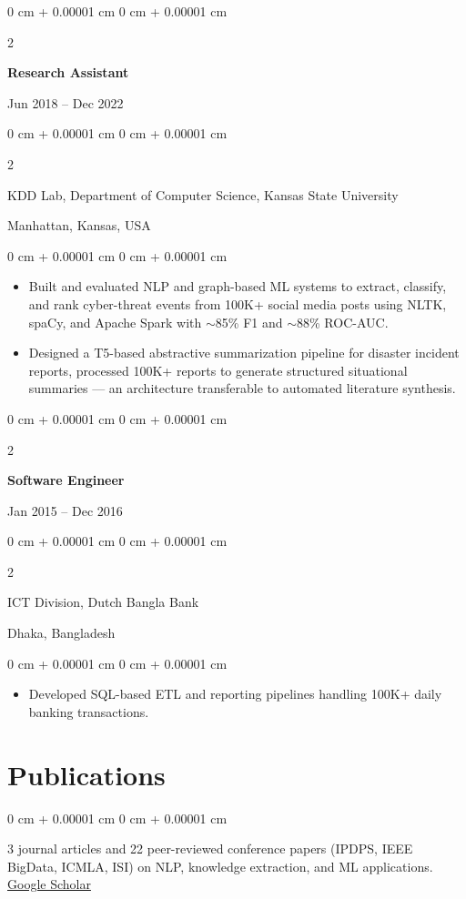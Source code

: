 \documentclass[10pt, letterpaper]{article}
\newenvironment{highlights}{
    \begin{itemize}[
        topsep=0.10 cm,
        parsep=0.10 cm,
        partopsep=0pt,
        itemsep=0pt,
        leftmargin=0 cm + 10pt
    ]
}{
    \end{itemize}
} %
\newenvironment{onecolentry}{
    \begin{adjustwidth}{
        0 cm + 0.00001 cm
    }{
        0 cm + 0.00001 cm
    }
}{
    \end{adjustwidth}
} %
\newenvironment{twocolentry}[2][]{
    \onecolentry
    \def\secondColumn{#2}
    \setcolumnwidth{\fill, 4.5 cm}
    \begin{paracol}{2}
}{
    \switchcolumn \raggedleft \secondColumn
    \end{paracol}
    \endonecolentry
} %
\let\hrefWithoutArrow\href
\begin{document}
    \vspace{1mm}

    \begin{twocolentry}{Jun 2018 -- Dec 2022}
        \textbf{Research Assistant}
    \end{twocolentry}
    \begin{twocolentry}{Manhattan, Kansas, USA}
       KDD Lab, Department of Computer Science, Kansas State University
    \end{twocolentry}
    \vspace{0.10 cm}
    \begin{onecolentry}
        \begin{highlights}
            \item Built and evaluated NLP and graph-based ML systems to extract, classify, and rank cyber-threat events from 100K+ social media posts using NLTK, spaCy, and Apache Spark with $\sim$85\% F1 and $\sim$88\% ROC-AUC.
            \item Designed a T5-based abstractive summarization pipeline for disaster incident reports, processed 100K+ reports to generate structured situational summaries — an architecture transferable to automated literature synthesis.
        \end{highlights}
    \end{onecolentry}

    \vspace{0.1 cm}
    \begin{twocolentry}{Jan 2015 -- Dec 2016}
        \textbf{Software Engineer}
    \end{twocolentry}
    \begin{twocolentry}{Dhaka, Bangladesh}
       ICT Division, Dutch Bangla Bank
    \end{twocolentry}

    \begin{onecolentry}
        \begin{highlights}
            \item Developed SQL-based ETL and reporting pipelines handling 100K+ daily banking transactions.
        \end{highlights}
    \end{onecolentry}

    \vspace{-1mm}
    \section{Publications}
        \begin{onecolentry}
            3 journal articles and 22 peer-reviewed conference papers (IPDPS, IEEE BigData, ICMLA, ISI) on NLP, knowledge extraction, and ML applications. \hrefWithoutArrow{https://scholar.google.com/citations?user=y5ndUuMAAAAJ\&hl=en\&oi=ao}{Google Scholar}
        \end{onecolentry}
\end{document}
